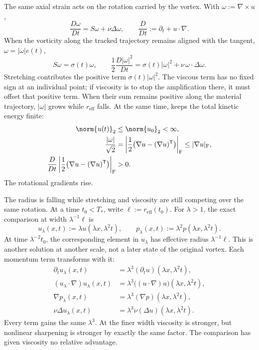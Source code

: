 The same axial strain acts on the rotation carried by the vortex.
With \(\omega:=\nabla\times u\),
\[
  \frac{D\omega}{Dt}
  =
  S\omega+\nu\Delta\omega,
  \qquad
  \frac{D}{Dt}
  :=
  \partial_t+u\cdot\nabla.
\]
When the vorticity along the tracked trajectory remains aligned with the tangent, \(\omega=|\omega|e(t)\),
\[
  S\omega
  =
  \sigma(t)\omega,
  \qquad
  \frac12\frac{D|\omega|^2}{Dt}
  =
  \sigma(t)|\omega|^2
  +
  \nu\,\omega\cdot\Delta\omega.
\]
Stretching contributes the positive term \(\sigma(t)|\omega|^2\).
The viscous term has no fixed sign at an individual point; if viscosity is to stop the amplification there, it must offset that positive term.
When their sum remains positive along the material trajectory, \(|\omega|\) grows while \(r_{\mathrm{eff}}\) falls.
At the same time,  keeps the total kinetic energy finite:
\[
\begin{aligned}
  \norm{u(t)}_2
  &\leq
  \norm{u_0}_2
  <
  \infty,
  \\
  \frac{|\omega|}{\sqrt2}
  &=
  \left|\frac12\bigl(\nabla u-(\nabla u)^{\mathsf T}\bigr)\right|_{\mathrm F}
  \leq
  |\nabla u|_{\mathrm F},
  \\
  \frac{D}{Dt}
  \left|\frac12\bigl(\nabla u-(\nabla u)^{\mathsf T}\bigr)\right|_{\mathrm F}
  &>
  0.
\end{aligned}
\]
The rotational gradients rise.


The radius is falling while stretching and viscosity are still competing over the same rotation.
At a time \(t_0<T_*\), write \(\ell:=r_{\mathrm{eff}}(t_0)\).
For \(\lambda>1\), the exact \NavierStokes{} comparison at width \(\lambda^{-1}\ell\) is
\[
  u_\lambda(x,t)
  :=
  \lambda u(\lambda x,\lambda^2t),
  \qquad
  p_\lambda(x,t)
  :=
  \lambda^2p(\lambda x,\lambda^2t).
\]
At time \(\lambda^{-2}t_0\), the corresponding element in \(u_\lambda\) has effective radius \(\lambda^{-1}\ell\).
This is another solution at another scale, not a later state of the original vortex.
Each momentum term transforms with it:
\[
\begin{aligned}
  \partial_tu_\lambda(x,t)
  &=
  \lambda^3(\partial_tu)(\lambda x,\lambda^2t),
  \\
  (u_\lambda\cdot\nabla)u_\lambda(x,t)
  &=
  \lambda^3\bigl((u\cdot\nabla)u\bigr)(\lambda x,\lambda^2t),
  \\
  \nabla p_\lambda(x,t)
  &=
  \lambda^3(\nabla p)(\lambda x,\lambda^2t),
  \\
  \nu\Delta u_\lambda(x,t)
  &=
  \lambda^3\nu(\Delta u)(\lambda x,\lambda^2t).
\end{aligned}
\]
Every term gains the same \(\lambda^3\).
At the finer width viscosity is stronger, but nonlinear sharpening is stronger by exactly the same factor.
The comparison has given viscosity no relative advantage.

